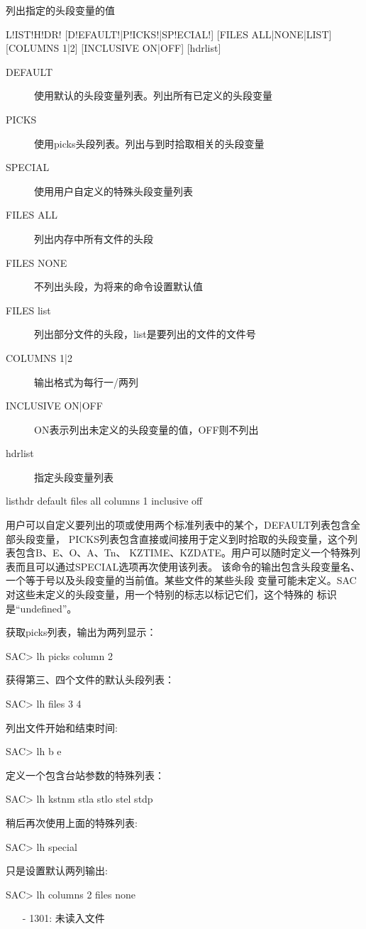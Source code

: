 \label{cmd:listhdr}

列出指定的头段变量的值

\begin{SACSTX}
L!IST!H!DR! [D!EFAULT!|P!ICKS!|SP!ECIAL!] [FILES ALL|NONE|LIST] 
    [COLUMNS 1|2] [INCLUSIVE ON|OFF] [hdrlist]
\end{SACSTX}

\begin{description}
\item [DEFAULT] 使用默认的头段变量列表。列出所有已定义的头段变量
\item [PICKS] 使用picks头段列表。列出与到时拾取相关的头段变量 
\item [SPECIAL] 使用用户自定义的特殊头段变量列表 
\item [FILES ALL] 列出内存中所有文件的头段
\item [FILES NONE] 不列出头段，为将来的命令设置默认值 
\item [FILES list] 列出部分文件的头段，list是要列出的文件的文件号 
\item [COLUMNS 1|2] 输出格式为每行一/两列
\item [INCLUSIVE ON|OFF] ON表示列出未定义的头段变量的值，OFF则不列出
\item [hdrlist] 指定头段变量列表  
\end{description}

\begin{SACDFT}
listhdr default files all columns 1 inclusive off
\end{SACDFT}

用户可以自定义要列出的项或使用两个标准列表中的某个，DEFAULT列表包含全部头段变量，
PICKS列表包含直接或间接用于定义到时拾取的头段变量，这个列表包含B、E、O、A、Tn、
KZTIME、KZDATE。用户可以随时定义一个特殊列表而且可以通过SPECIAL选项再次使用该列表。
该命令的输出包含头段变量名、一个等于号以及头段变量的当前值。某些文件的某些头段
变量可能未定义。SAC对这些未定义的头段变量，用一个特别的标志以标记它们，这个特殊的
标识是``undefined''。

获取picks列表，输出为两列显示：
\begin{SACCode}
SAC> lh picks column 2
\end{SACCode}

获得第三、四个文件的默认头段列表：
\begin{SACCode}
SAC> lh files 3 4
\end{SACCode}

列出文件开始和结束时间:
\begin{SACCode}
SAC> lh b e
\end{SACCode}

定义一个包含台站参数的特殊列表：
\begin{SACCode}
SAC> lh kstnm stla stlo stel stdp
\end{SACCode}

稍后再次使用上面的特殊列表:
\begin{SACCode}
SAC> lh special
\end{SACCode}

只是设置默认两列输出:
\begin{SACCode}
SAC> lh columns 2 files none
\end{SACCode}

\begin{itemize}
\item[-]1301: 未读入文件
\end{itemize}

